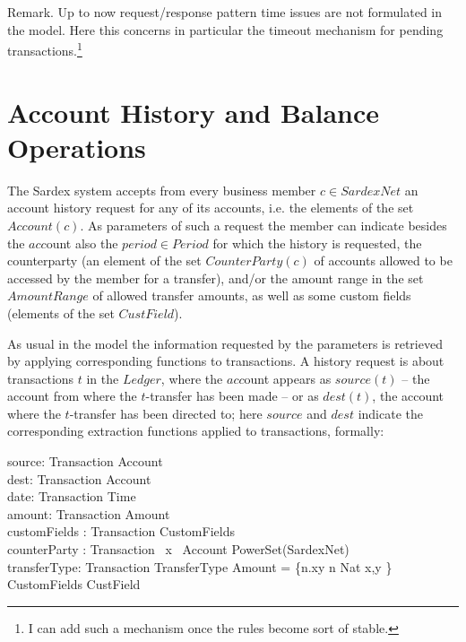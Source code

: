 Remark. Up to now request/response pattern time issues are not formulated in the model. Here this concerns in particular the  timeout mechanism for pending transactions.\footnote{I can add such a mechanism once the rules become sort of stable.}

\section{Account History and Balance Operations}
\label{sect:accHistory}

The Sardex system accepts from every business member $c \in SardexNet$ an account history request for any of its accounts, i.e. the elements of  the set $Account(c)$. As parameters of such a request the member can indicate besides the $acc$ount also 
the $period \in Period$ for which the history is requested, the counterparty (an 
element of the set $CounterParty(c)$  of accounts allowed to be accessed by the 
member for a transfer), and/or the amount range in the set $AmountRange$ of allowed 
transfer amounts, as well as some custom fields (elements of the set $CustField$).



As usual in the model the information requested by the parameters is retrieved by applying corresponding functions to transactions. A  history request is about transactions $t$ in the $Ledger$, where the $acc$ount appears as $source(t)$ -- the account from where the $t$-transfer has been made -- or as $dest(t)$, the account where the $t$-transfer has been directed to; here $source$ and $dest$ 
indicate the corresponding extraction functions applied to transactions, formally:

\begin{asm}
source: Transaction \rightarrow Account \\
dest: Transaction \rightarrow Account\\
date: Transaction \rightarrow Time\\
amount: Transaction \rightarrow Amount \\
customFields : Transaction \rightarrow CustomFields \\
counterParty : Transaction ~x~ Account \rightarrow PowerSet(SardexNet) \\
transferType: Transaction \rightarrow TransferType\+
\WHERE \+
Amount = \{n.xy \mid n \in Nat  \leq x,y \}\\
CustomFields \subseteq CustField
\end{asm}


